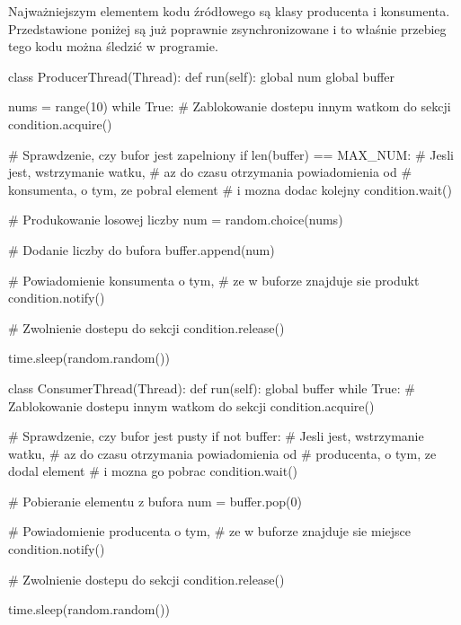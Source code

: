 \documentclass{article}
\begin{document}
Najważniejszym elementem kodu źródłowego są klasy producenta i konsumenta. Przedstawione poniżej są już poprawnie zsynchronizowane i to właśnie przebieg tego kodu można śledzić w programie.

\begin{python}
class ProducerThread(Thread):
    def run(self):
        global num
        global buffer
        
        nums = range(10)
        while True:
        	# Zablokowanie dostepu innym watkom do sekcji
            condition.acquire() 
            
            # Sprawdzenie, czy bufor jest zapelniony          
            if len(buffer) == MAX_NUM:
            	# Jesli jest, wstrzymanie watku, 
            	# az do czasu otrzymania powiadomienia od 
            	# konsumenta, o tym, ze pobral element 
            	# i mozna dodac kolejny 
                condition.wait() 
            
            # Produkowanie losowej liczby
            num = random.choice(nums) 
            
            # Dodanie liczby do bufora
            buffer.append(num) 
            
            # Powiadomienie konsumenta o tym, 
            # ze w buforze znajduje sie produkt
            condition.notify() 
                              
                              
            # Zwolnienie dostepu do sekcji
            condition.release() 
            
            time.sleep(random.random())

\end{python}


\newpage

\begin{python}
class ConsumerThread(Thread):
    def run(self):
        global buffer
        while True:     
        	# Zablokowanie dostepu innym watkom do sekcji                 
            condition.acquire()
           
		# Sprawdzenie, czy bufor jest pusty
            if not buffer:     
            	# Jesli jest, wstrzymanie watku, 
            	# az do czasu otrzymania powiadomienia od 
            	# producenta, o tym, ze dodal element 
            	# i mozna go pobrac         
                condition.wait()
                              
            # Pobieranie elementu z bufora               
            num = buffer.pop(0)
                       
            # Powiadomienie producenta o tym, 
            # ze w buforze znajduje sie miejsce
            condition.notify()
            
            # Zwolnienie dostepu do sekcji
            condition.release()

            time.sleep(random.random())

\end{python}
\end{document}
